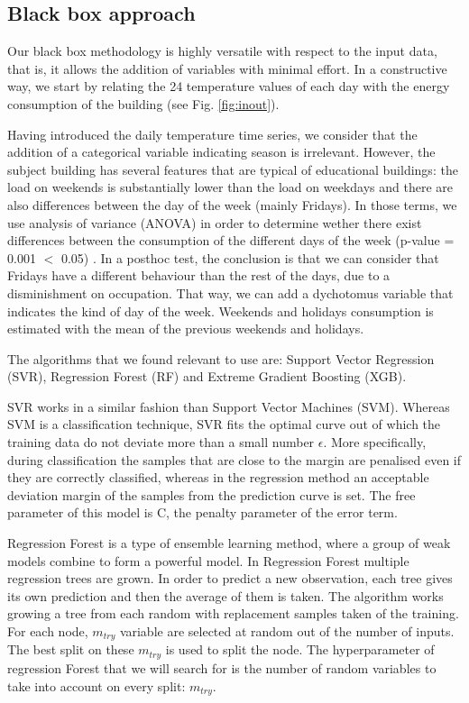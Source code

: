 \documentclass[10pt, conference, compsocconf]{IEEEtran}
\begin{document}
\subsection{Black box approach}

Our black box methodology is highly versatile with respect to the input data, that is, it allows the addition of variables with minimal effort. In a constructive way, we start by relating the 24 temperature values of each day with the energy consumption of the building (see Fig. \ref{fig:inout}).

Having introduced the daily temperature time series, we consider that the addition of a categorical variable indicating season is irrelevant. However, the subject building has several features that are typical of educational buildings: the load %
on weekends is substantially lower than the load on weekdays and there are also differences between the day of the week (mainly Fridays).
In those terms, we use analysis of variance (ANOVA) in order to determine wether there exist differences between the consumption of the different days of the week (p-value = 0.001 $<$ 0.05) . 	In a posthoc test, the conclusion is that we can consider that Fridays have a different behaviour than the rest of the days, due to a disminishment on occupation. That way, we can add a dychotomus variable that indicates the kind of day of the week. Weekends and holidays consumption is estimated with the mean of the previous weekends and holidays.

The algorithms that we found relevant to use are: Support Vector Regression (SVR), Regression Forest (RF) and Extreme Gradient Boosting (XGB). 

SVR works in a similar fashion than Support Vector Machines (SVM). Whereas SVM is a classification technique, SVR fits the optimal curve out of which the training data do not deviate more than a small number $\epsilon$. More specifically, during classification the samples that are close to the margin are penalised even if they are correctly classified, whereas in the regression method an acceptable deviation margin of the samples from the prediction curve is set.
The free parameter of this model is C, the penalty parameter of the error term.%

Regression Forest is a type of ensemble learning method, where a group of weak models combine to form a powerful model. In Regression Forest multiple regression trees are grown. In order to predict a new observation, each tree gives its own prediction and then the average of them is taken. The algorithm works growing a tree from each random with replacement samples taken of the training. For each node, $m_{try}$ variable are selected at random out of the number of inputs. The best split on these $m_{try}$ is used to split the node. The hyperparameter of regression Forest that we will search for is the number of random variables to take into account on every split: $m_{try}$. 
\end{document}
